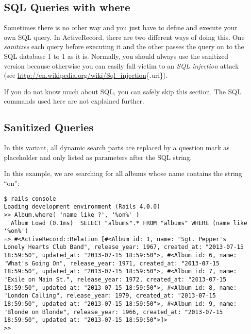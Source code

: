 \documentclass[a4paper]{book}
\newcounter{tab}[chapter]
\begin{document}
\subsection{SQL Queries with where}\label{sql-queries-with-where}

Sometimes there is no other way and you just have to define and execute your own SQL query. In ActiveRecord, there are two different ways of doing this. One \emph{sanitizes} each query before executing it and the other passes the query on to the SQL database 1 to 1 as it is. Normally, you should always use the sanitized version because otherwise you can easily fall victim to an \emph{SQL injection} attack (see \url{http://en.wikipedia.org/wiki/Sql_injection}\{.uri\}).

If you do not know much about SQL, you can safely skip this section. The SQL commands used here are not explained further.

\subsection{Sanitized Queries}\label{sanitized-queries}

In this variant, all dynamic search parts are replaced by a question mark as placeholder and only listed as parameters after the SQL string.

In this example, we are searching for all albums whose name contains the string “on”:

\begin{shaded}\begin{verbatim}
$ rails console
Loading development environment (Rails 4.0.0)
>> Album.where( 'name like ?', '%on%' )
  Album Load (0.1ms)  SELECT "albums".* FROM "albums" WHERE (name like '%on%')
=> #<ActiveRecord::Relation [#<Album id: 1, name: "Sgt. Pepper's Lonely Hearts Club Band", release_year: 1967, created_at: "2013-07-15 18:59:50", updated_at: "2013-07-15 18:59:50">, #<Album id: 6, name: "What's Going On", release_year: 1971, created_at: "2013-07-15 18:59:50", updated_at: "2013-07-15 18:59:50">, #<Album id: 7, name: "Exile on Main St.", release_year: 1972, created_at: "2013-07-15 18:59:50", updated_at: "2013-07-15 18:59:50">, #<Album id: 8, name: "London Calling", release_year: 1979, created_at: "2013-07-15 18:59:50", updated_at: "2013-07-15 18:59:50">, #<Album id: 9, name: "Blonde on Blonde", release_year: 1966, created_at: "2013-07-15 18:59:50", updated_at: "2013-07-15 18:59:50">]>
>>
\end{verbatim}\end{shaded}
\end{document}
